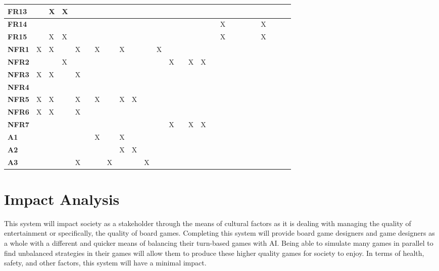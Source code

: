 \documentclass[12pt]{article}
\begin{document}
\begin{table}[h!]
{\begin{tabular}{|l|l|l|l|l|l|l|l|l|l|l|l|l|l|l|l|l|l|l|l|l|l|l|l|l|l|}
\textbf{FR13} &   & X & X &   &   &   &   &   &   &   &   &   &   &   &   &   &   &   &  &   &   &   &   &   &   \\ \hline
\textbf{FR14} &   &   &   &   &   &   &   &   &   &   &   &   &   &   &   &   & X &   &  &   &   & X &   &   &   \\ \hline
\textbf{FR15} &   & X & X &   &   &   &   &   &   &   &   &   &   &   &   &   & X &   &  &   &   & X &   &   &   \\ \hline
\textbf{NFR1} & X & X &   & X &   & X &   & X &   &   & X &   &   &   &   &   &   &   &  &   &   &   &   &   &   \\ \hline
\textbf{NFR2} &   &   & X &   &   &   &   &   &   &   &   & X &   & X & X &   &   &   &  &   &   &   &   &   &   \\ \hline
\textbf{NFR3} & X & X &   & X &   &   &   &   &   &   &   &   &   &   &   &   &   &   &  &   &   &   &   &   &   \\ \hline
\textbf{NFR4} &   &   &   &   &   &   &   &   &   &   &   &   &   &   &   &   &   &   &  &   &   &   &   &   &   \\ \hline
\textbf{NFR5} & X & X &   & X &   & X &   & X & X &   &   &   &   &   &   &   &   &   &  &   &   &   &   &   &   \\ \hline
\textbf{NFR6} & X & X &   & X &   &   &   &   &   &   &   &   &   &   &   &   &   &   &  &   &   &   &   &   &   \\ \hline
\textbf{NFR7} &   &   &   &   &   &   &   &   &   &   &   & X &   & X & X &   &   &   &  &   &   &   &   &   &   \\ \hline
\textbf{A1}   &   &   &   &   &   & X &   & X &   &   &   &   &   &   &   &   &   &   &  &   &   &   &   &   &   \\ \hline
\textbf{A2}   &   &   &   &   &   &   &   & X & X &   &   &   &   &   &   &   &   &   &  &   &   &   &   &   &   \\ \hline
\textbf{A3}   &   &   &   & X &   &   & X &   &   & X &   &   &   &   &   &   &   &   &  &   &   &   &   &   &   \\ \hline
\end{tabular}
}
\end{table}


\section{Impact Analysis}

This system will impact society as a stakeholder through the means of cultural factors as it is dealing with managing the quality of entertainment or specifically, the quality of board games. Completing this system will provide board game designers and game designers as a whole with a different and quicker means of balancing their turn-based games with AI. Being able to simulate many games in parallel to find unbalanced strategies in their games will allow them to produce these higher quality games for society to enjoy. In terms of health, safety, and other factors, this system will have a minimal impact. 
\end{document}
